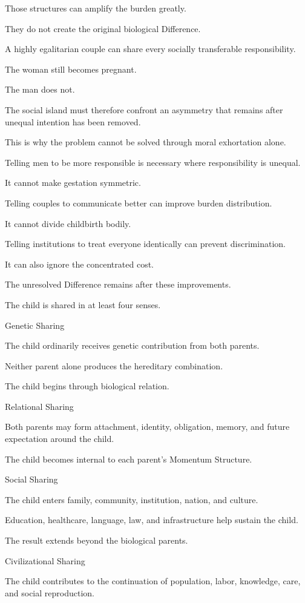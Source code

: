 Those structures can amplify the burden greatly.

They do not create the original biological Difference.

A highly egalitarian couple can share every socially transferable responsibility.

The woman still becomes pregnant.

The man does not.

The social island must therefore confront an asymmetry that remains after unequal intention has been removed.

This is why the problem cannot be solved through moral exhortation alone.

Telling men to be more responsible is necessary where responsibility is unequal.

It cannot make gestation symmetric.

Telling couples to communicate better can improve burden distribution.

It cannot divide childbirth bodily.

Telling institutions to treat everyone identically can prevent discrimination.

It can also ignore the concentrated cost.

The unresolved Difference remains after these improvements.

The child is shared in at least four senses.

Genetic Sharing

The child ordinarily receives genetic contribution from both parents.

Neither parent alone produces the hereditary combination.

The child begins through biological relation.

Relational Sharing

Both parents may form attachment, identity, obligation, memory, and future expectation around the child.

The child becomes internal to each parent’s Momentum Structure.

Social Sharing

The child enters family, community, institution, nation, and culture.

Education, healthcare, language, law, and infrastructure help sustain the child.

The result extends beyond the biological parents.

Civilizational Sharing

The child contributes to the continuation of population, labor, knowledge, care, and social reproduction.

